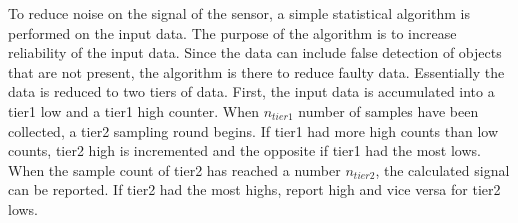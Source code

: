 To reduce noise on the signal of the sensor, a simple statistical algorithm is
performed on the input data. The purpose of the algorithm is to increase reliability of the input data. Since the data can include false detection of objects that are not present, the algorithm is there to reduce  faulty data.  Essentially the data is reduced to two tiers
of data. First, the input data is accumulated into a tier1 low and a tier1 high
counter. When $n_{tier1}$ number of samples have been collected, a tier2 sampling round begins. If tier1
had more high counts than low counts, tier2 high is incremented and the opposite if
tier1 had the most lows. When the sample count of tier2 has reached a number
$n_{tier2}$, the calculated signal can be reported. If tier2 had the most highs,
report high and vice versa for tier2 lows.